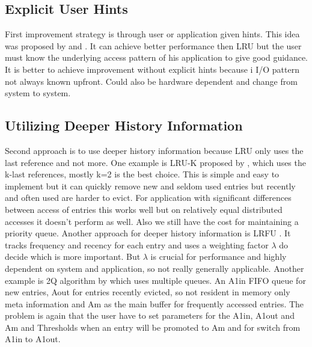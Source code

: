 \documentclass[
	12pt,
	a4paper,
	abstract,
	bibliography=totoc,
	chapterprefix,
	headings=openright,
	numbers=endperiod,
	parskip=half,
	twoside,
]{scrreprt}
\begin{document}
\subsection{Explicit User Hints}

First improvement strategy is through user or application given hints.
This idea was proposed by \cite{cao1994application} and \cite{patterson1995informed}.
It can achieve better performance then LRU but the user must know the underlying access pattern of his application to give good guidance.
It is better to achieve improvement without explicit hints because i
I/O pattern not always known upfront.
Could also be hardware dependent and change from system to system.

\subsection{Utilizing Deeper History Information}
Second approach is to use deeper history information because LRU only uses the last reference and not more.
One example is LRU-K proposed by \cite{o1993lru},
which uses the k-last references, mostly k=2 is the best choice.
This is simple and easy to implement but it can quickly remove new and seldom used entries but recently and often used are harder to evict.
For application with significant differences between access of entries this works well but on relatively equal distributed accesses it doesn't perform as well.
Also we still have the cost for maintaining a priority queue.
Another approach for  deeper history information is LRFU \cite{lee2001lrfu}. 
It tracks frequency and recency for each entry and uses a weighting factor $\lambda$ do decide which is more important.
But $\lambda$ is crucial for performance and highly dependent on system and application,
so not really generally applicable.
Another example is 2Q  algorithm by \cite{shasha19942q} which uses multiple queues.
An A1in FIFO queue for new entries, Aout for entries recently evicted, so not resident in memory only meta information and Am as the main buffer for frequently accessed entries.
The problem is again that the user have to set parameters for the A1in, A1out and Am and Thresholds when an entry will be promoted to Am and for switch from A1in to A1out.
\end{document}
